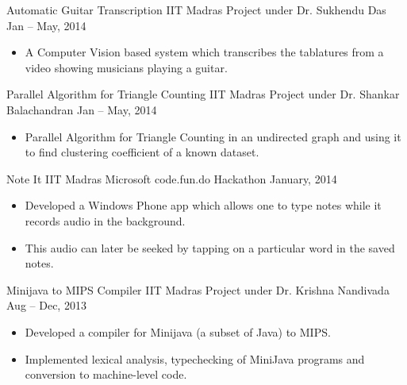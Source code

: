 \documentclass[letterpaper,11pt]{resume}
\begin{document}
\begin{itemize}
{    }
   
   
   
    

   \credential
    {{Automatic Guitar Transcription}}
    {IIT Madras}
    {Project under Dr. Sukhendu Das}
    {Jan -- May, 2014}
    {
     \begin{itemize}
      \item A Computer Vision based system which transcribes the tablatures from a video showing musicians playing a guitar.
     \end{itemize}

    }

   \credential
    {{Parallel Algorithm for Triangle Counting}}
    {IIT Madras}
    {Project under Dr. Shankar Balachandran}
    {Jan -- May, 2014}
    {
     \begin{itemize}
      \item Parallel Algorithm for Triangle Counting in an undirected graph and using it to find clustering coefficient of a known dataset.
     \end{itemize}

    }
    \credential
    {{Note It}}
    {IIT Madras}
    {Microsoft code.fun.do Hackathon}
    {January, 2014}
    {
     \begin{itemize}
      \item Developed a Windows Phone app which allows one to type notes while it records audio in the background. 
      \item This audio can later be seeked by tapping on a particular word in the saved notes.
     \end{itemize}

    }

   \credential
    {{Minijava to MIPS Compiler}}
    {IIT Madras}
    {Project under Dr. Krishna Nandivada}
    {Aug -- Dec, 2013}
    {
     \begin{itemize}
      \item Developed a compiler for Minijava (a subset of Java) to MIPS. 
      \item Implemented lexical analysis, typechecking of MiniJava programs and conversion to machine-level code.
     \end{itemize}

    }
       

\end{itemize}
\end{document}

